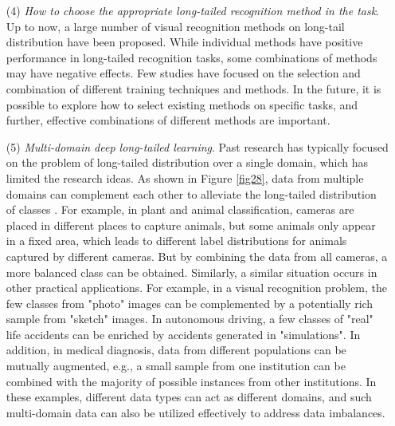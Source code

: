 \documentclass[10pt]{article} %
\begin{document}
\begin{itemize}
     \item[(4)] \emph{How to choose the appropriate long-tailed recognition method in the task}. Up to now, a large number of visual recognition methods on long-tail distribution have been proposed. While individual methods have positive performance in long-tailed recognition tasks, some combinations of methods may have negative effects. Few studies have focused on the selection and combination of different training techniques and methods. In the future, it is possible to explore how to select existing methods on specific tasks, and further, effective combinations of different methods are important. 
     \item[(5)] \emph{Multi-domain deep long-tailed learning}. Past research has typically focused on the problem of long-tailed distribution over a single domain, which has limited the research ideas. As shown in Figure \ref{fig28}, data from multiple domains can complement each other to alleviate the long-tailed distribution of classes \cite{paper119}. For example, in plant and animal classification, cameras are placed in different places to capture animals, but some animals only appear in a fixed area, which leads to different label distributions for animals captured by different cameras. But by combining the data from all cameras, a more balanced class can be obtained. Similarly, a similar situation occurs in other practical applications. For example, in a visual recognition problem, the few classes from "photo" images can be complemented by a potentially rich sample from "sketch" images. In autonomous driving, a few classes of "real" life accidents can be enriched by accidents generated in "simulations". In addition, in medical diagnosis, data from different populations can be mutually augmented, e.g., a small sample from one institution can be combined with the majority of possible instances from other institutions. In these examples, different data types can act as different domains, and such multi-domain data can also be utilized effectively to address data imbalances.


\end{itemize}
\end{document}
